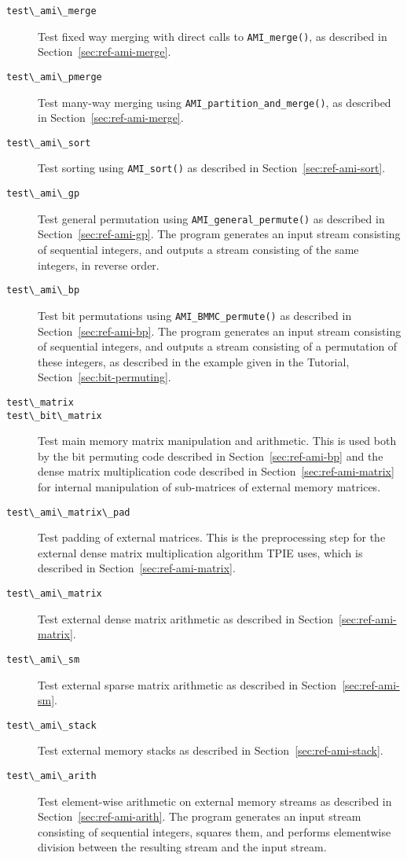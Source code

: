 \begin{description}
\item[\verb|test\_ami\_merge|] Test fixed way merging with direct
  calls to \verb|AMI_merge()|, as described in 
  Section~\ref{sec:ref-ami-merge}.
\item[\verb|test\_ami\_pmerge|] Test many-way merging using 
  \verb|AMI_partition_and_merge()|, as described in 
  Section~\ref{sec:ref-ami-merge}.
\item[\verb|test\_ami\_sort|] Test sorting using \verb|AMI_sort()| as
  described in Section~\ref{sec:ref-ami-sort}.
\item[\verb|test\_ami\_gp|] Test general permutation using
  \verb|AMI_general_permute()| as described in Section~\ref{sec:ref-ami-gp}.
The program generates an input stream
consisting of sequential integers, and outputs a stream consisting of 
the same integers, in reverse order.
\item[\verb|test\_ami\_bp|] Test bit permutations using
  \verb|AMI_BMMC_permute()| as described in
  Section~\ref{sec:ref-ami-bp}. The program generates an input stream
consisting of sequential integers, and outputs a stream consisting of 
a permutation of these integers, as described in the example given in the Tutorial, Section~\ref{sec:bit-permuting}.
\item[\verb|test\_matrix|]
\item[\verb|test\_bit\_matrix|] Test main memory matrix manipulation
  and arithmetic.  This is used both by the bit permuting code
  described in Section~\ref{sec:ref-ami-bp} and the dense matrix
  multiplication code described in Section~\ref{sec:ref-ami-matrix}
  for internal manipulation of sub-matrices of external memory
  matrices.
\item[\verb|test\_ami\_matrix\_pad|] Test padding of external
  matrices.  This is the preprocessing step for the external dense
  matrix multiplication algorithm TPIE uses, which is described in 
  Section~\ref{sec:ref-ami-matrix}. 
\item[\verb|test\_ami\_matrix|] Test external dense matrix arithmetic
  as described in Section~\ref{sec:ref-ami-matrix}.
\item[\verb|test\_ami\_sm|] Test external sparse matrix arithmetic
  as described in Section~\ref{sec:ref-ami-sm}.
\item[\verb|test\_ami\_stack|] Test external memory stacks as
  described in Section~\ref{sec:ref-ami-stack}.
\item[\verb|test\_ami\_arith|] Test element-wise arithmetic on
  external memory streams as described in Section~\ref{sec:ref-ami-arith}.
The program generates an input stream
consisting of sequential integers, squares them, and performs 
elementwise division between the resulting stream and the input stream.
\end{description}


